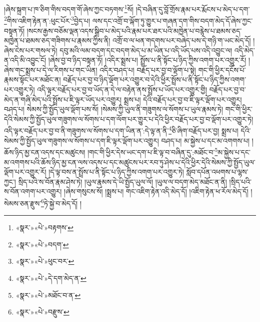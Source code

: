 །ཞེས་སྐྲག་པ་ཁ་ཅིག་གིས་བདག་གོ་ཞེས་ཀྱང་བཏགས་\footnote{«སྣར་»«པེ་»བརྟགས་}སོ། །དེ་བཞིན་དུ་བློ་གྲོས་རྣམ་པར་རྨོངས་པ་མེད་པ་དག་\footnote{«སྣར་»«པེ་»བདག་}གིས་འཇིག་རྟེན་ན་:ཕུང་པོར་\footnote{«སྣར་»«པེ་»ཕུང་བར་}བྱེད་པ། ལས་དང་འགྲོ་བ་ལྐོག་ཏུ་གྱུར་པ་གཞན་དག་གིས་བདག་མེད་དོ་ཞེས་ཀྱང་བསྟན་ཏོ། །སངས་རྒྱས་བཅོམ་ལྡན་འདས་སྒྲིབ་པ་མེད་པའི་རྣམ་པར་ཐར་པའི་མཁྱེན་པ་བརྙེས་པ་ཐམས་ཅད་མཁྱེན་པ་ཐམས་ཅད་གཟིགས་པ་རྣམས་ཀྱིས་ནི། འགྲོ་བ་ལ་ཕན་གདགས་པར་བཞེད་པས་དེ་གཉི་ག་ཡང་མེད་དོ། །ཞེས་ངེས་པར་གསལ་ཏེ། དབུ་མའི་ལམ་བདག་དང་བདག་མེད་པ་མ་ཡིན་པ་འདི་ཡོད་པས་འདི་འབྱུང་ལ། འདི་མེད་ན་འདི་མི་འབྱུང་ངོ། །ཞེས་བྱ་བ་ཉིད་བསྟན་ཏོ། །འདིར་སྨྲས་པ། སྤྲོས་པ་ནི་སྟོང་པ་ཉིད་ཀྱིས་འགག་པར་འགྱུར་རོ། །ཞེས་གང་སྨྲས་པ་དེ་ལ་རིགས་པ་གང་ཡིན། འདིར་བཤད་པ། བརྗོད་པར་བྱ་བ་ལྡོག་པ་སྟེ། གང་གི་ཕྱིར་དངོས་པོ་རྣམས་སྟོང་པར་མཐོང་ན། བརྗོད་པར་བྱ་བ་ཉིད་ལྡོག་པར་འགྱུར་བ་དེའི་ཕྱིར་སྤྲོས་པ་ནི་སྟོང་པ་ཉིད་ཀྱིས་འགག་པར་འགྱུར་ཏེ། འདི་ལྟར་བརྗོད་པར་བྱ་བ་ཡོད་ན་དེ་ལ་བརྟེན་ནས་སྤྲོས་པ་ཡོད་པར་འགྱུར་གྱི། བརྗོད་པར་བྱ་བ་མེད་ན་གཞི་མེད་པའི་སྤྲོས་པ་ཇི་ལྟར་ཡོད་པར་འགྱུར། སྨྲས་པ། དེའི་བརྗོད་པར་བྱ་བ་ཇི་ལྟར་ལྡོག་པར་འགྱུར། བཤད་པ། སེམས་ཀྱི་སྤྱོད་ཡུལ་ལྡོག་པས་སོ། །སེམས་ཀྱི་ཡུལ་ནི་གཟུགས་ལ་སོགས་པ་ཡུལ་རྣམས་ཏེ། གང་གི་ཕྱིར་དེའི་སེམས་ཀྱི་སྤྱོད་ཡུལ་གཟུགས་ལ་སོགས་པ་དག་ལོག་པར་གྱུར་པ་དེའི་ཕྱིར་བརྗོད་པར་བྱ་བ་ལྡོག་པར་འགྱུར་ཏེ། འདི་ལྟར་བརྗོད་པར་བྱ་བ་ནི་གཟུགས་ལ་སོགས་པ་དག་ཡིན་ན་:དེ་ལྟ་ན་ནི་\footnote{«སྣར་»«པེ་»དེ་དག་མེད་ན་}ཅི་ཞིག་བརྗོད་པར་བྱ། སྨྲས་པ། དེའི་སེམས་ཀྱི་སྤྱོད་ཡུལ་གཟུགས་ལ་སོགས་པ་དག་ཇི་ལྟར་ལྡོག་པར་འགྱུར། བཤད་པ། མ་སྐྱེས་པ་དང་མ་འགགས་པ། །ཆོས་ཉིད་མྱ་ངན་འདས་དང་མཚུངས། །གང་གི་ཕྱིར་དེས་ཡང་དག་པ་ཇི་ལྟ་བ་བཞིན་དུ་:མཐོང་བ་\footnote{«སྣར་»«པེ་»མཐོང་བ་ན་}མ་སྐྱེས་པ་དང་མ་འགགས་པའི་ཆོས་ཉིད་མྱ་ངན་ལས་འདས་པ་དང་མཚུངས་པར་རབ་ཏུ་ཤེས་པ་དེའི་ཕྱིར་དེའི་སེམས་ཀྱི་སྤྱོད་ཡུལ་ལྡོག་པར་འགྱུར་རོ། །དེ་ལྟ་བས་ན་སྤྲོས་པ་ནི་སྟོང་པ་ཉིད་ཀྱིས་འགག་པར་འགྱུར་ཏེ། སློབ་དཔོན་འཕགས་པ་ལྷས་ཀྱང་། སྲིད་པའི་ས་བོན་རྣམ་ཤེས་ཏེ། །ཡུལ་རྣམས་དེ་ཡི་སྤྱོད་ཡུལ་ལོ། །ཡུལ་ལ་བདག་མེད་མཐོང་ན་ནི། །སྲིད་པའི་ས་བོན་འགག་པར་འགྱུར། །ཞེས་གསུངས་སོ། །སྨྲས་པ། གང་འཇིག་རྟེན་འདི་མེད་དོ། །འཇིག་རྟེན་ཕ་རོལ་མེད་དོ། །སེམས་ཅན་རྫུས་\footnote{«སྣར་»«པེ་»བརྫུས་}ཏེ་སྐྱེ་བ་མེད་དོ། །
